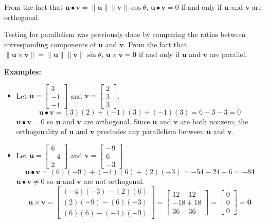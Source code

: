 \documentclass{article}
\begin{document}
From the fact that \(\mathbf{u} \bullet \mathbf{v} = \|\mathbf{u}\| \|\mathbf{v}\| \cos\theta\), \(\mathbf{u} \bullet \mathbf{v} = 0\) if and only if \(\mathbf{u}\) and \(\mathbf{v}\) are orthogonal. 

Testing for parallelism was previously done by comparing the ratios between corresponding components of \(\mathbf{u}\) and \(\mathbf{v}\). From the fact that \(\left\|\mathbf{u} \times \mathbf{v}\right\| = \|\mathbf{u}\| \|\mathbf{v}\| \sin\theta\), \(\mathbf{u} \times \mathbf{v} = \mathbf{0}\) if and only if \(\mathbf{u}\) and \(\mathbf{v}\) are parallel.    

\textbf{Examples:}
\begin{itemize}
\item Let \(\mathbf{u} = \begin{bmatrix} 3 \\ -1 \\ -1 \end{bmatrix}\) and \(\mathbf{v} = \begin{bmatrix} 2 \\ 3 \\ 3 \end{bmatrix}\). 
\[\mathbf{u} \bullet \mathbf{v} = (3)(2) + (-1)(3) + (-1)(3) = 6 - 3 - 3 = 0\]
\(\mathbf{u} \bullet \mathbf{v} = 0\) so \(\mathbf{u}\) and \(\mathbf{v}\) are orthogonal. Since \(\mathbf{u}\) and \(\mathbf{v}\) are both nonzero, the orthogonality of \(\mathbf{u}\) and \(\mathbf{v}\) precludes any parallelism between \(\mathbf{u}\) and \(\mathbf{v}\).
\item Let \(\mathbf{u} = \begin{bmatrix} 6 \\ -4 \\ 2 \end{bmatrix}\) and \(\mathbf{v} = \begin{bmatrix} -9 \\ 6 \\ -3 \end{bmatrix}\). 
\[\mathbf{u} \bullet \mathbf{v} = (6)(-9) + (-4)(6) + (2)(-3) = -54 - 24 - 6 = -84\]
\(\mathbf{u} \bullet \mathbf{v} \neq 0\) so \(\mathbf{u}\) and \(\mathbf{v}\) are not orthogonal. 
\[\mathbf{u} \times \mathbf{v} = \begin{bmatrix} (-4)(-3) - (2)(6) \\ (2)(-9) - (6)(-3) \\ (6)(6) - (-4)(-9) \end{bmatrix} = \begin{bmatrix} 12 - 12 \\ -18 + 18 \\ 36 - 36 \end{bmatrix} = \begin{bmatrix} 0 \\ 0 \\ 0 \end{bmatrix} = \mathbf{0}\]

\end{itemize}
\end{document}
